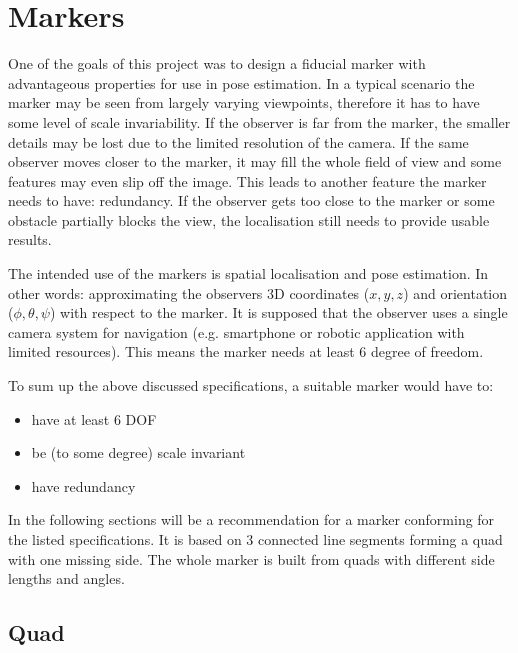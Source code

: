 \chapter{Markers}\label{sect:marker}

One of the goals of this project was to design a fiducial marker with advantageous properties for use in pose estimation.
In a typical scenario the marker may be seen from largely varying viewpoints, therefore it has to have some level of scale invariability.
If the observer is far from the marker, the smaller details may be lost due to the limited resolution of the camera.
If the same observer moves closer to the marker, it may fill the whole field of view and some features may even slip off the image.
This leads to another feature the marker needs to have: redundancy.
If the observer gets too close to the marker or some obstacle partially blocks the view, the localisation still needs to provide usable results.

The intended use of the markers is spatial localisation and pose estimation.
In other words: approximating the observers 3D coordinates ($x, y, z$) and orientation ($\phi, \theta, \psi$) with respect to the marker.
It is supposed that the observer uses a single camera system for navigation (e.g. smartphone or robotic application with limited resources).
This means the marker needs at least 6 degree of freedom.

To sum up the above discussed specifications, a suitable marker would have to:
\begin{itemize}
	\item have at least 6 DOF
	\item be (to some degree) scale invariant
	\item have redundancy
\end{itemize}

In the following sections will be a recommendation for a marker conforming for the listed specifications.
It is based on 3 connected line segments forming a quad with one missing side.
The whole marker is built from quads with different side lengths and angles.

\section{Quad}\label{sect:quad}


